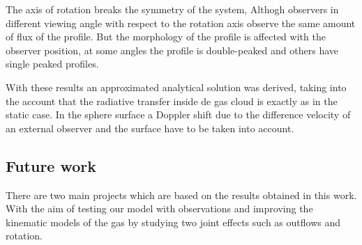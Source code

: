 The axis of rotation breaks the symmetry of the system, Althogh 
observers in different viewing angle with respect to the rotation axis
observe the same amount of flux of the \ly profile. But the morphology
of the profile is affected with the observer position, at some angles
the profile is double-peaked and others have single peaked profiles. 
 
 
With these results an approximated analytical solution was derived, 
taking into the account that the radiative transfer inside de gas
cloud is exactly as in the static case. In the sphere surface
a Doppler shift due to the difference velocity of an external 
observer and the surface have to be taken into account.  


\subsection{Future work}


There are two main projects which are based on the results obtained in 
this work. With the aim of testing our model with observations and
improving the kinematic models of the gas by studying two joint effects
such as outflows and rotation.  

